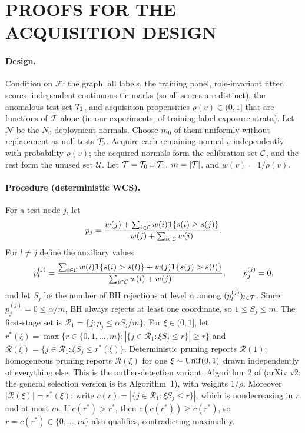 \section{PROOFS FOR THE ACQUISITION DESIGN}
\label{app:wcsdesign}

\paragraph{Design.}
Condition on $\mathcal F$: the graph, all labels, the training panel, role-invariant fitted scores, independent continuous tie marks (so all scores are distinct), the anomalous test set $\mathcal{T}_1$, and acquisition propensities $\rho(v)\in(0,1]$ that are functions of $\mathcal F$ alone (in our experiments, of training-label exposure strata). Let $\mathcal N$ be the $N_0$ deployment normals. Choose $m_0$ of them uniformly without replacement as null tests $\mathcal{T}_0$. Acquire each remaining normal $v$ independently with probability $\rho(v)$; the acquired normals form the calibration set $\mathcal{C}$, and the rest form the unused set $\mathcal U$. Let $\mathcal{T}=\mathcal{T}_0\cup\mathcal{T}_1$, $m=|\mathcal{T}|$, and $w(v)=1/\rho(v)$.

\paragraph{Procedure (deterministic WCS).}
For a test node $j$, let
\[
p_j=\frac{w(j)+\sum_{i\in\mathcal{C}}w(i)\mathbf{1}\{s(i)\ge s(j)\}}{w(j)+\sum_{i\in\mathcal{C}}w(i)}.
\]
For $l\neq j$ define the auxiliary values
\[
p_l^{(j)}=\frac{\sum_{i\in\mathcal{C}}w(i)\mathbf{1}\{s(i)>s(l)\}+w(j)\mathbf{1}\{s(j)>s(l)\}}{\sum_{i\in\mathcal{C}}w(i)+w(j)},\qquad p_j^{(j)}=0,
\]
and let $S_j$ be the number of BH rejections at level $\alpha$ among $(p_l^{(j)})_{l\in\mathcal{T}}$. Since $p_j^{(j)}=0\le\alpha/m$, BH always rejects at least one coordinate, so $1\le S_j\le m$. The first-stage set is $\mathcal R_1=\{j:p_j\le\alpha S_j/m\}$. For $\xi\in(0,1]$, let $r^*(\xi)=\max\{r\in\{0,1,\ldots,m\}:|\{j\in\mathcal R_1:\xi S_j\le r\}|\ge r\}$ and $\mathcal R(\xi)=\{j\in\mathcal R_1:\xi S_j\le r^*(\xi)\}$. Deterministic pruning reports $\mathcal R(1)$; homogeneous pruning reports $\mathcal R(\xi)$ for one $\xi\sim{\rm Unif}(0,1)$ drawn independently of everything else. This is the outlier-detection variant, Algorithm~2 of \citet{jin2023algorithm} (arXiv v2; the general selection version is its Algorithm~1), with weights $1/\rho$. Moreover $|\mathcal R(\xi)|=r^*(\xi)$: write $c(r)=|\{j\in\mathcal R_1:\xi S_j\le r\}|$, which is nondecreasing in $r$ and at most $m$. If $c(r^*)>r^*$, then $c(c(r^*))\ge c(r^*)$, so $r=c(r^*)\in\{0,\ldots,m\}$ also qualifies, contradicting maximality.

